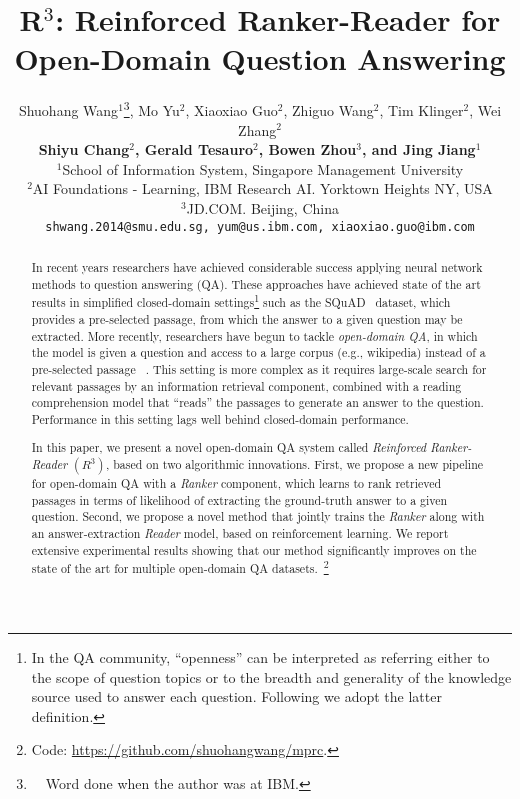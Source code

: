 \documentclass[letterpaper]{article} %
\begin{document}
%

\title{R$^3$: Reinforced Ranker-Reader for Open-Domain Question Answering}

\author{ Shuohang Wang$^1$\thanks{~~Word done when the author was at IBM.}, Mo Yu$^2$, Xiaoxiao Guo$^2$, Zhiguo Wang$^2$, Tim Klinger$^2$, Wei Zhang$^2$\\
{ \bf \Large Shiyu Chang$^2$, Gerald Tesauro$^2$, Bowen Zhou$^3$, and Jing Jiang$^1$} \\
$^1${School of Information System, Singapore Management University}\\
$^2${AI Foundations - Learning, IBM Research AI. Yorktown Heights NY, USA}\\
$^3${JD.COM. Beijing, China}\\
{\texttt {shwang.2014@smu.edu.sg,
 yum@us.ibm.com,
xiaoxiao.guo@ibm.com}}
}
 
\maketitle
\begin{abstract}
In recent years researchers have achieved considerable success applying neural network methods to question answering (QA).  These approaches have achieved state of the art results in simplified closed-domain settings\footnote{In the QA community, ``openness'' can be interpreted as referring either to the scope of question topics or to the breadth and generality of the knowledge source used to answer each question. Following \cite{chen2017reading} we adopt the latter definition.} such as the SQuAD~\cite{rajpurkar2016squad} dataset, which provides a pre-selected passage, from which the answer to a given question may be extracted.  More recently, researchers have begun to tackle {\it open-domain QA}, in which the model is given a question and access to a large corpus (e.g., wikipedia) instead of a pre-selected passage ~\cite{chen2017reading}.
This setting is more complex as it requires large-scale search for relevant passages by an information retrieval %
component, combined with a reading comprehension %
model that
``reads'' the passages to generate an answer to the question.
Performance in this 
setting 
lags well behind closed-domain performance.

In this paper, we present a novel open-domain QA system called {\it{Reinforced Ranker-Reader}} 
$(R^3)$, based on two algorithmic innovations.  
First, we propose a new pipeline for open-domain QA with a \textit{Ranker} component, which learns to rank retrieved passages in terms of likelihood of extracting the ground-truth answer to a given question.
Second, we propose a novel method that jointly trains the \textit{Ranker} along with an answer-extraction \textit{Reader} model, based on reinforcement learning.
We report extensive experimental results showing that our method significantly improves on the state of the art for multiple open-domain QA datasets.~\footnote{Code:  \url{https://github.com/shuohangwang/mprc}. }
\end{abstract}
\end{document}
